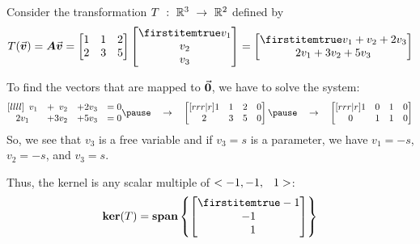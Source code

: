 \documentclass{beamer}
\begin{document}
\begin{frame}
\begin{example}
Consider the transformation $T\ :\ \mathbb{R}^3\ \rightarrow\ \mathbb{R}^2$ defined by
\begin{equation*}
T(\vect{v})=\mat{A}\vect{v}=
\begin{bmatrix}
1 & 1 & 2 \\
2 & 3 & 5 \\
\end{bmatrix}
\bvector{v_1,v_2,v_3}=
\bvector{v_1+v_2+2v_3, 2v_1+3v_2+5v_3}
\end{equation*}
\pause

\vspace{-3mm}
To find the vectors that are mapped to ${\vec{\boldsymbol{0}}}$, we have to solve the system:
\begin{equation*}
\begin{matrix}[llll]
\phantom{2}v_1&+\phantom{3}v_2&+2v_3 &= 0\\
2v_1&+3v_2&+5v_3 &= 0\\
\end{matrix}
\pause\quad\rightarrow\quad
\begin{bmatrix}[rrr|r]
1 & 1 & 2 & 0 \\
2 & 3 & 5 & 0 \\
\end{bmatrix}
\pause\quad\rightarrow\quad
\begin{bmatrix}[rrr|r]
1 & 0 & 1 & 0 \\
0 & 1 & 1 & 0 \\
\end{bmatrix}
\end{equation*}\pause
So, we see that $v_3$ is a free variable and if $v_3=s$ is a parameter, we have $v_1=-s$, $v_2=-s$, and $v_3=s$.\pause

\vspace{2mm}
Thus, the kernel is any scalar multiple of $<-1,-1,\+1>$:
\begin{equation*}
\ker(T)=\spn\left\{\bvector{-1,-1,\+1}\right\}
\end{equation*}
\end{example}
\end{frame}
\end{document}
